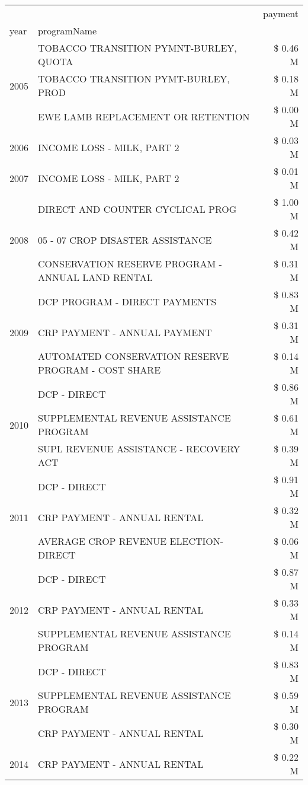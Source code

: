 \begin{tabular}{llr}
\toprule
 &  & payment \\
year & programName &  \\
\midrule
\multirow[t]{3}{*}{2005} & TOBACCO TRANSITION PYMNT-BURLEY, QUOTA & \$ 0.46 M \\
 & TOBACCO TRANSITION PYMT-BURLEY, PROD & \$ 0.18 M \\
 & EWE LAMB REPLACEMENT OR RETENTION & \$ 0.00 M \\
\cline{1-3}
2006 & INCOME LOSS - MILK, PART 2 & \$ 0.03 M \\
\cline{1-3}
2007 & INCOME LOSS - MILK, PART 2 & \$ 0.01 M \\
\cline{1-3}
\multirow[t]{3}{*}{2008} & DIRECT AND COUNTER CYCLICAL PROG & \$ 1.00 M \\
 & 05 - 07 CROP DISASTER ASSISTANCE & \$ 0.42 M \\
 & CONSERVATION RESERVE PROGRAM - ANNUAL LAND RENTAL & \$ 0.31 M \\
\cline{1-3}
\multirow[t]{3}{*}{2009} & DCP PROGRAM - DIRECT PAYMENTS & \$ 0.83 M \\
 & CRP PAYMENT - ANNUAL PAYMENT & \$ 0.31 M \\
 & AUTOMATED CONSERVATION RESERVE PROGRAM - COST SHARE & \$ 0.14 M \\
\cline{1-3}
\multirow[t]{3}{*}{2010} & DCP - DIRECT & \$ 0.86 M \\
 & SUPPLEMENTAL REVENUE ASSISTANCE PROGRAM & \$ 0.61 M \\
 & SUPL REVENUE ASSISTANCE - RECOVERY ACT & \$ 0.39 M \\
\cline{1-3}
\multirow[t]{3}{*}{2011} & DCP - DIRECT & \$ 0.91 M \\
 & CRP PAYMENT - ANNUAL RENTAL & \$ 0.32 M \\
 & AVERAGE CROP REVENUE ELECTION-DIRECT & \$ 0.06 M \\
\cline{1-3}
\multirow[t]{3}{*}{2012} & DCP - DIRECT & \$ 0.87 M \\
 & CRP PAYMENT - ANNUAL RENTAL & \$ 0.33 M \\
 & SUPPLEMENTAL REVENUE ASSISTANCE PROGRAM & \$ 0.14 M \\
\cline{1-3}
\multirow[t]{3}{*}{2013} & DCP - DIRECT & \$ 0.83 M \\
 & SUPPLEMENTAL REVENUE ASSISTANCE PROGRAM & \$ 0.59 M \\
 & CRP PAYMENT - ANNUAL RENTAL & \$ 0.30 M \\
\cline{1-3}
\multirow[t]{3}{*}{2014} & CRP PAYMENT - ANNUAL RENTAL & \$ 0.22 M \\

\end{tabular}
